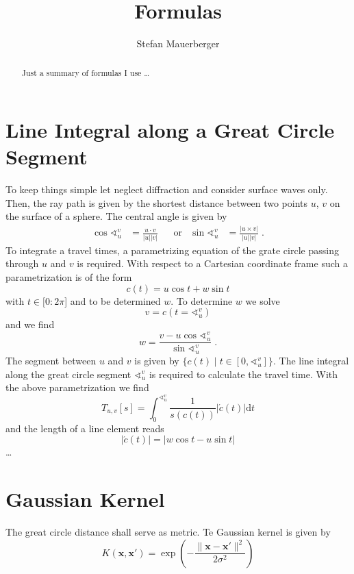 \documentclass{article}
\title{Formulas}
\author{Stefan Mauerberger}
\begin{document}
\maketitle
\begin{abstract}
    Just a summary of formulas I use \dots
\end{abstract}


\section{Line Integral along a Great Circle Segment}
To keep things simple let neglect diffraction and consider surface waves only.
Then, the ray path is given by the shortest distance between two points $u$, $v$ on the surface of a sphere.
The central angle is given by
\begin{align}
    \cos \sphericalangle_u^v &= \frac{u \cdot v}{|u||v|} &
    &\text{or}&
    \sin \sphericalangle_u^v &= \frac{|u \times v|}{|u||v|}
    \; .
\end{align}
To integrate a travel times, a parametrizing equation of the grate circle passing through $u$ and $v$ is required.
With respect to a Cartesian coordinate frame such a parametrization is of the form
\begin{equation}
    c(t) = u \cos t + w \sin t
\end{equation}
with $t \in [0:2\pi$] and to be determined $w$.
To determine $w$ we solve
\begin{equation}
    v = c(t = \sphericalangle_u^v)
\end{equation}
and we find
\begin{equation}
    w = \frac{v - u \cos \sphericalangle_u^v}{\sin \sphericalangle_u^v}
    \; .
\end{equation}
The segment between $u$ and $v$ is given by $\{c(t) \mid t \in [0, \sphericalangle_u^v]\}$.
The line integral along the great circle segment $\sphericalangle_u^v$ is required to calculate the travel time.
With the above parametrization we find
\begin{equation}
    T_{u,v}[s]
    = \int_0^{\sphericalangle_u^v} \frac 1{s(c(t))} |\acute c(t)| \mathrm d t
\end{equation}
and the length of a line element reads
\begin{equation}
    |\acute c(t)| = |w \cos t - u \sin t|
\end{equation}
\dots



\section{Gaussian Kernel}
The great circle distance shall serve as metric.
Te Gaussian kernel is given by
\begin{equation}
    K(\mathbf {x} ,\mathbf {x'})   =
    \exp \left(-{\frac {\|\mathbf {x} -\mathbf {x'} \|^{2}}{2\sigma ^{2}}}\right)
\end{equation}
\end{document}
